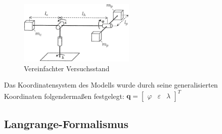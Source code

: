 \documentclass[10pt,twocolumn]{article}
\begin{document}
	\begin{figure}[ht]
		\centering
		\includegraphics[width=0.5\textwidth]{images/setup}
		\caption{Vereinfachter Versuchsstand}
		\label{setup}
	\end{figure}
	Das Koordinatensystem des Modells wurde durch seine generalisierten Koordinaten folgendermaßen festgelegt: $\bm q = \begin{bmatrix}
	\varphi & \varepsilon & \lambda
	\end{bmatrix}^T $

	\subsection{Langrange-Formalismus}
\end{document}
